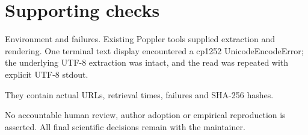 \documentclass[10pt]{article}
\begin{document}
\section*{Supporting checks}
Environment and failures. Existing Poppler tools supplied extraction and rendering. One terminal text display encountered a cp1252 UnicodeEncodeError; the underlying UTF-8 extraction was intact, and the read was repeated with explicit UTF-8 stdout.\par
They contain actual URLs, retrieval times, failures and SHA-256 hashes.\par
No accountable human review, author adoption or empirical reproduction is asserted. All final scientific decisions remain with the maintainer.\par
\end{document}

